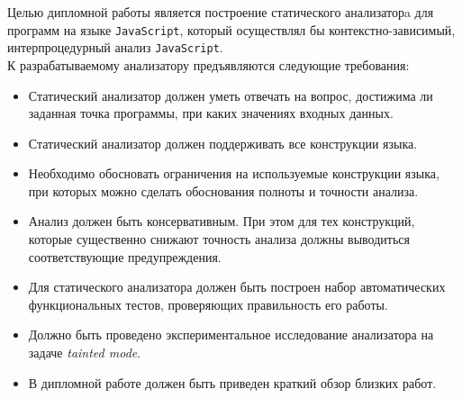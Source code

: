 %
%

Целью дипломной работы является построение статического анализаторa для программ
на языке \texttt{JavaScript}, который осуществлял бы контекстно-зависимый,
интерпроцедурный анализ \texttt{JavaScript}. 
\\[\smallskipamount]
К разрабатываемому анализатору предъявляются следующие требования:
\begin{itemize}
  \item Статический анализатор должен уметь отвечать на вопрос, достижима ли заданная
    точка программы, при каких значениях входных данных.
  \item Статический анализатор должен поддерживать все конструкции языка.
  \item Необходимо обосновать ограничения на используемые конструкции языка, при
    которых можно сделать обоснования полноты и точности анализа.
  \item Анализ должен быть консервативным. При этом для тех конструкций, которые
    существенно снижают точность анализа должны выводиться соответствующие
    предупреждения.
  \item Для статического анализатора должен быть построен набор автоматических
    функциональных тестов, проверяющих правильность его работы.
  \item Должно быть проведено экспериментальное исследование анализатора на
    задаче \emph{tainted mode}.
  \item В дипломной работе должен быть приведен краткий обзор близких работ.
\end{itemize}




